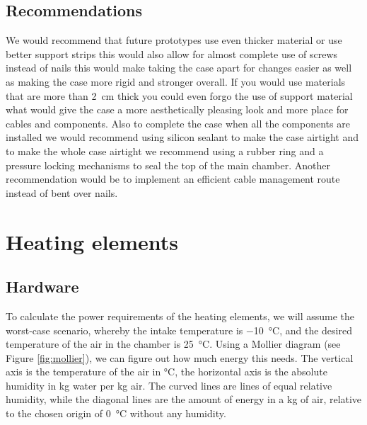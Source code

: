 \documentclass[a4paper,oneside]{book}
\begin{document}
\subsection{Recommendations}
We would recommend that future prototypes use even thicker material or use
better support strips this would also allow for almost complete use of screws
instead of nails this would make taking the case apart for changes easier as
well as making the case more rigid and stronger overall. If you would use
materials that are more than \SI{2}{\cm} thick you could even forgo the use of
support material what would give the case a more aesthetically pleasing look
and more place for cables and components. Also to complete the case when all
the components are installed we would recommend using silicon sealant to make
the case airtight and to make the whole case airtight we recommend using a
rubber ring and a pressure locking mechanisms to seal the top of the main
chamber. Another recommendation would be to implement an efficient cable
management route instead of bent over nails.

\section{Heating elements}
\subsection{Hardware}
To calculate the power requirements of the heating elements, we will assume the
worst-case scenario, whereby the intake temperature is \SI{-10}{\celsius}, and
the desired temperature of the air in the chamber is \SI{25}{\celsius}. Using a Mollier
diagram (see Figure \ref{fig:mollier}), we can figure out how much energy this needs. The
vertical axis is the temperature of the air in \si{\celsius}, the horizontal axis is the
absolute humidity in kg water per kg air. The curved lines are lines of equal
relative humidity, while the diagonal lines are the amount of energy in a kg of
air, relative to the chosen origin of \SI{0}{\celsius} without any humidity.
\end{document}
